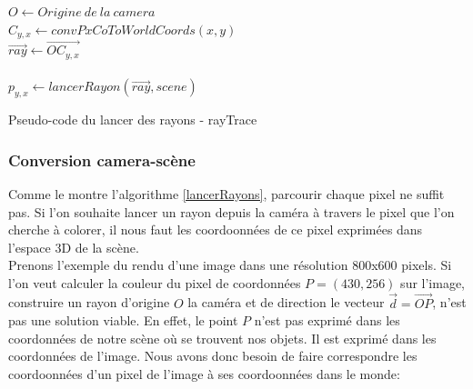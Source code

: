 \documentclass[11pt]{article}
\begin{document}
\begin {algorithm}[H]
	\DontPrintSemicolon

	$O \gets Origine\ de\ la\ camera$\\
	{
		{
			$C_{y, x} \gets convPxCoToWorldCoords(x, y)$\\
			$\overrightarrow{ray} \gets \overrightarrow{OC_{y,x}}$\\
			\hfill\\
			$p_{y, x} \gets lancerRayon(\overrightarrow{ray}, scene)$
		}
	}

	\caption{Pseudo-code du lancer des rayons - rayTrace}
	\label{lancerRayons}
\end {algorithm}

\subsubsection{Conversion camera-scène}
\label{conversionCamera}

Comme le montre l'algorithme \ref{lancerRayons}, parcourir chaque pixel ne suffit pas. Si l'on souhaite lancer un rayon depuis la caméra à travers le pixel que l'on cherche à colorer, il nous faut les coordoonnées de ce pixel exprimées dans l'espace 3D de la scène.\\
Prenons l'exemple du rendu d'une image dans une résolution 800x600 pixels. Si l'on veut calculer la couleur du pixel de coordonnées $P = (430, 256)$ sur l'image, construire un rayon d'origine $O$ la caméra et de direction le vecteur $\overrightarrow{d} = \overrightarrow{OP}$, n'est pas une solution viable. En effet, le point $P$ n'est pas exprimé dans les coordonnées de notre scène où se trouvent nos objets. Il est exprimé dans les coordonnées de l'image. Nous avons donc besoin de faire correspondre les coordoonnées d'un pixel de l'image à ses coordoonnées dans le monde:
\end{document}
